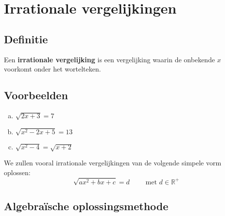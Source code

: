 \documentclass[12pt,twoside]{article}
\begin{document}
\thispagestyle{empty}
\newpage

\tableofcontents
\thispagestyle{empty}
\newpage


\pagestyle{fancy}
\fancyhead[RE,LO]{}

\section{Irrationale vergelijkingen}

\subsection{Definitie}

\begin{mdframed}
Een {\bf irrationale vergelijking} is een vergelijking waarin de onbekende $x$ voorkomt onder het wortelteken.
\end{mdframed}

\subsection{Voorbeelden}
\begin{enumerate}[(a)]
  \item $\sqrt{2x+3}=7$
  \item $\sqrt{x^2-2x+5}=13$
  \item $\sqrt{x^2-4}=\sqrt{x+2}$
\end{enumerate}

We zullen vooral irrationale vergelijkingen van de volgende simpele vorm oplossen:
$$\sqrt{ax^2+bx+c}=d\qquad\mbox{ met } d\in\mathbb{R}^+$$

\subsection{Algebraïsche oplossingsmethode}
\end{document}
